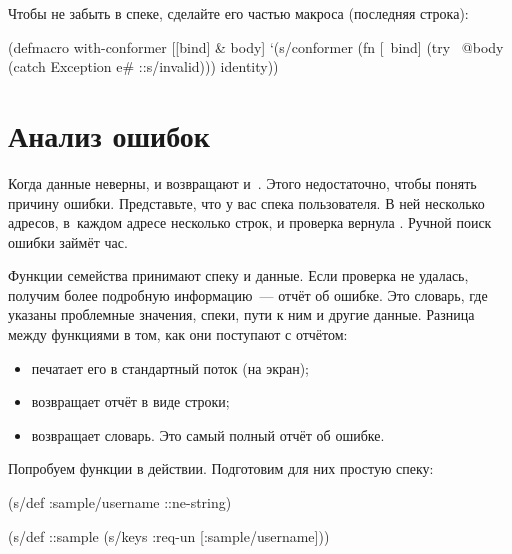 Чтобы не забыть  в спеке, сделайте его частью макроса
 (последняя строка):

\begin{clojure}
(defmacro with-conformer
  [[bind] & body]
  `(s/conformer
    (fn [~bind]
      (try
        ~@body
        (catch Exception e#
          ::s/invalid)))
    identity))
\end{clojure}

\section{Анализ ошибок}


\label{spec-explain}

Когда данные неверны,  и  возвращают 
и~. Этого недостаточно, чтобы понять причину
ошибки. Представьте, что у вас спека пользователя. В ней несколько адресов,
в~каждом адресе несколько строк, и проверка вернула . Ручной поиск
ошибки займёт час.

Функции семейства  принимают спеку и данные. Если проверка не
удалась, получим более подробную информацию~--- отчёт об ошибке. Это словарь,
где указаны проблемные значения, спеки, пути к ним и другие данные. Разница
между функциями в том, как они поступают с отчётом:

\begin{itemize}


\item
   печатает его в стандартный поток (на экран);

\item
   возвращает отчёт в виде строки;

\item
   возвращает словарь. Это самый полный отчёт об ошибке.

\end{itemize}

Попробуем функции в действии. Подготовим для них простую спеку:

\begin{clojure}
(s/def :sample/username ::ne-string)

(s/def ::sample
  (s/keys :req-un [:sample/username]))
\end{clojure}

